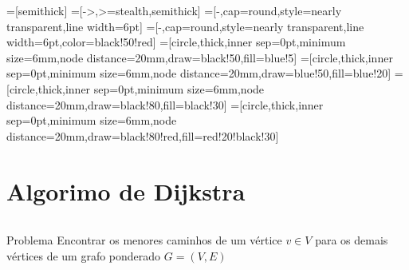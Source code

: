 \begin{comment}

\documentclass{beamer}
\usepackage[latin1]{inputenc}
\usepackage[T1]{fontenc}
\usepackage[frenchb]{babel}

\usepackage{tikz}




\usetheme{Darmstadt}
\end{comment}






=[semithick] %
=[->,>=stealth,semithick] %
=[-,cap=round,style=nearly transparent,line width=6pt] %
=[-,cap=round,style=nearly transparent,line width=6pt,color=black!50!red]
 =[circle,thick,inner sep=0pt,minimum size=6mm,node distance=20mm,draw=black!50,fill=blue!5]
=[circle,thick,inner sep=0pt,minimum size=6mm,node distance=20mm,draw=blue!50,fill=blue!20]
   =[circle,thick,inner sep=0pt,minimum size=6mm,node distance=20mm,draw=black!80,fill=black!30]
  =[circle,thick,inner sep=0pt,minimum size=6mm,node distance=20mm,draw=black!80!red,fill=red!20!black!30]
\section*{Algorimo de Dijkstra}

\begin{frame}
	\begin{columns}
	\begin{block}{Problema}
		Encontrar os menores caminhos de um vértice $v \in V$ para os demais vértices de um grafo ponderado $G=(V,E)$
	\end{block}
		
	\end{columns}
\end{frame}

